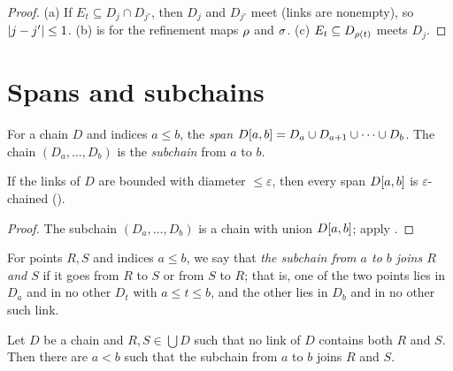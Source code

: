 \begin{proof}
(a) If $E_t\subseteq D_j\cap D_{j'}$, then $D_j$ and $D_{j'}$ meet (links are nonempty), so
$\left\lvert j-j'\right\rvert\le1$. (b) is  for the refinement maps $\rho$ and $\sigma$. (c) $E_t\subseteq
D_{\rho(t)}$ meets $D_j$.
\end{proof}


\section{Spans and subchains}

\begin{definition}\label{def:span}
For a chain $D$ and indices $a\le b$, the \emph{span} $D[a,b]=D_a\cup D_{a+1}\cup\dots\cup D_b$. The
chain $(D_a,\dots,D_b)$ is the \emph{subchain} from $a$ to $b$.
\end{definition}

\begin{lemma}\label{lem:span-chained}
If the links of $D$ are bounded with diameter $\le\varepsilon$, then every span $D[a,b]$ is
$\varepsilon$-chained ().
\end{lemma}

\begin{proof}
The subchain $(D_a,\dots,D_b)$ is a chain with union $D[a,b]$; apply .
\end{proof}


\begin{definition}\label{def:subchain-from}
For points $R,S$ and indices $a\le b$, we say that \emph{the subchain from $a$ to $b$ joins $R$ and $S$} if
it goes from $R$ to $S$ or from $S$ to $R$; that is, one of the two points lies in $D_a$ and in no other
$D_t$ with $a\le t\le b$, and the other lies in $D_b$ and in no other such link.
\end{definition}


\begin{lemma}\label{lem:subchain-exists}
Let $D$ be a chain and $R,S\in\bigcup D$ such that no link of $D$ contains both $R$ and $S$. Then there are
$a<b$ such that the subchain from $a$ to $b$ joins $R$ and $S$.
\end{lemma}

